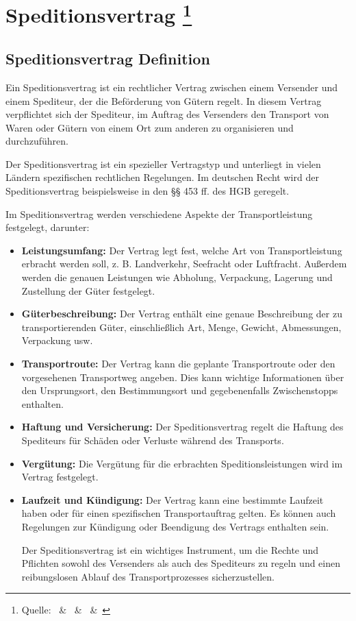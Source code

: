 
    \chapter[Speditionsvertrag]{Speditionsvertrag \footnote{Quelle:~\cite{Handelsrecht} \&~\cite{ADSp} \&~\cite{Speditionsbetriebslehre_und_Logistik} \&~\cite{Speditionsvertrag}}}

    \section{Speditionsvertrag Definition}

    Ein Speditionsvertrag ist ein rechtlicher Vertrag zwischen einem Versender  und einem Spediteur, der die Beförderung von Gütern regelt. In diesem Vertrag verpflichtet sich der Spediteur, im Auftrag des Versenders den Transport von Waren oder Gütern von einem Ort zum anderen zu organisieren und durchzuführen.

    Der Speditionsvertrag ist ein spezieller Vertragstyp und unterliegt in vielen Ländern spezifischen rechtlichen Regelungen. Im deutschen Recht wird der Speditionsvertrag beispielsweise in den §§ 453 ff. des \ac{HGB} geregelt.

    Im Speditionsvertrag werden verschiedene Aspekte der Transportleistung festgelegt, darunter:
    \begin{itemize}
        \item \textbf{Leistungsumfang:} Der Vertrag legt fest, welche Art von Transportleistung erbracht werden soll, z. B. Landverkehr, Seefracht oder Luftfracht. Außerdem werden die genauen Leistungen wie Abholung, Verpackung, Lagerung und Zustellung der Güter festgelegt.
        \item \textbf{Güterbeschreibung:} Der Vertrag enthält eine genaue Beschreibung der zu transportierenden Güter, einschließlich Art, Menge, Gewicht, Abmessungen, Verpackung usw.
        \item \textbf{Transportroute:} Der Vertrag kann die geplante Transportroute oder den vorgesehenen Transportweg angeben. Dies kann wichtige Informationen über den Ursprungsort, den Bestimmungsort und gegebenenfalls Zwischenstopps enthalten.
        \item \textbf{Haftung und Versicherung:} Der Speditionsvertrag regelt die Haftung des Spediteurs für Schäden oder Verluste während des Transports.
        \item \textbf{Vergütung:} Die Vergütung für die erbrachten Speditionsleistungen wird im Vertrag festgelegt.
        \item \textbf{Laufzeit und Kündigung:} Der Vertrag kann eine bestimmte Laufzeit haben oder für einen spezifischen Transportauftrag gelten. Es können auch Regelungen zur Kündigung oder Beendigung des Vertrags enthalten sein.

    Der Speditionsvertrag ist ein wichtiges Instrument, um die Rechte und Pflichten sowohl des Versenders als auch des Spediteurs zu regeln und einen reibungslosen Ablauf des Transportprozesses sicherzustellen.
\end{itemize}

